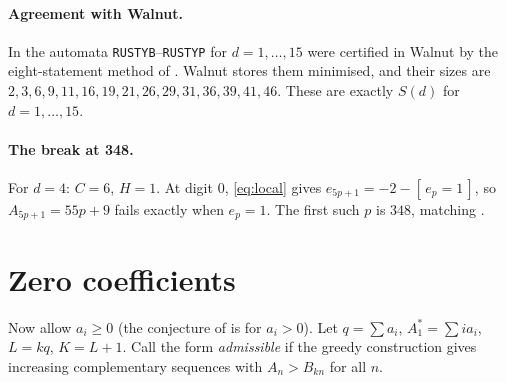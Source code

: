 \documentclass[11pt]{article}
\theoremstyle{remark}\newtheorem{remark}[theorem]{Remark}
\theoremstyle{definition}\newtheorem{definition}[theorem]{Definition}
\newcommand{\ind}[1]{[\,#1\,]}
\begin{document}
\paragraph{Agreement with Walnut.} In \cite{ab} the automata \texttt{RUSTYB}--\texttt{RUSTYP} for \(d=1,\dots,15\) were certified in Walnut by the eight-statement method of \cite[Thm.~5]{fj}. Walnut stores them minimised, and their sizes are \(2,3,6,9,11,16,19,21,26,29,31,36,39,41,46\). These are exactly \(S(d)\) for \(d=1,\dots,15\).

\paragraph{The break at 348.} For \(d=4\): \(C=6\), \(H=1\). At digit \(0\), \eqref{eq:local} gives \(e_{5p+1}=-2-\ind{e_p=1}\), so \(A_{5p+1}=55p+9\) fails exactly when \(e_p=1\). The first such \(p\) is \(348\), matching \cite{fj}.

\section{Zero coefficients}\label{sec:zero}
Now allow \(a_i\ge0\) (the conjecture of \cite{fj} is for \(a_i>0\)). Let \(q=\sum a_i\), \(A_1^*=\sum ia_i\), \(L=kq\), \(K=L+1\). Call the form \emph{admissible} if the greedy construction gives increasing complementary sequences with \(A_n>B_{kn}\) for all \(n\).
\end{document}
